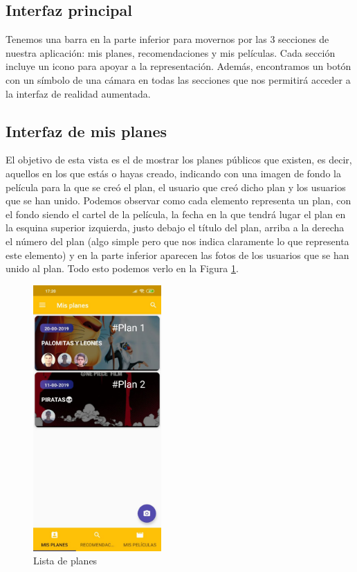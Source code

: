 \subsection{Interfaz principal}
\label{makereference3.4.1}
Tenemos una barra en la parte inferior para movernos por las 3 secciones de nuestra aplicación: mis planes, recomendaciones y mis películas.
Cada sección incluye un icono para apoyar a la representación.
Además, encontramos un botón con un símbolo de una cámara en todas las secciones que nos permitirá acceder a la interfaz de realidad aumentada.
\subsection{Interfaz de mis planes}
\label{makereference3.4.2}
El objetivo de esta vista es el de mostrar los planes públicos que existen, es decir, aquellos en los que estás o hayas creado, indicando con una imagen de fondo la película para la que se creó el plan, el usuario
que creó dicho plan y los usuarios que se han unido. 
Podemos observar como cada elemento representa un plan, con el fondo siendo el cartel de la película, la fecha en la que tendrá lugar el plan en la esquina superior izquierda,
justo debajo el título del plan, arriba a la derecha el número del plan (algo simple pero que nos indica
claramente lo que representa este elemento) y en la parte inferior aparecen las fotos de los usuarios que se han unido al plan.
Todo esto podemos verlo en la Figura \ref{fig:listaPlanes}.
\begin{figure}[H]
    \centering
    \includegraphics[height=4in]{figures/plansList.jpg}
    \caption{Lista de planes}
    \label{fig:listaPlanes}
\end{figure}

